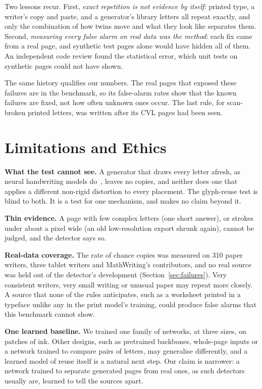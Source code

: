 \documentclass[conference]{IEEEtran}
\begin{document}
Two lessons recur. First, \emph{exact repetition is not evidence by itself}: printed type, a writer's copy and
paste, and a generator's library letters all repeat exactly, and only the combination of how twins move and what they
look like separates them. Second, \emph{measuring every false alarm on real data was the method}: each fix came from a
real page, and synthetic test pages alone would have hidden all of them. An independent code review found the
statistical error, which unit tests on synthetic pages could not have shown.

The same history qualifies our numbers. The real pages that exposed these failures are in the benchmark, so its
false-alarm rates show that the known failures are fixed, not how often unknown ones occur. The last rule, for
scan-broken printed letters, was written after its \CvlBeforeFixK{} CVL pages had been seen.

\section{Limitations and Ethics}

\textbf{What the test cannot see.} A generator that draws every letter afresh, as neural handwriting
models do~\cite{graves2013generating,fogel2020scrabblegan}, leaves no copies, and neither does one that applies a
different non-rigid distortion to every placement. The glyph-reuse test is blind to both. It is a test for one
mechanism, and makes no claim beyond it.

\textbf{Thin evidence.} A page with few complex letters (one short answer), or strokes under about a pixel wide (an old
low-resolution export shrunk again), cannot be judged, and the detector says so.

\textbf{Real-data coverage.} The rate of chance copies was measured on 310 paper writers, three tablet writers and
MathWriting's contributors, and no real source was held out of the detector's development (Section~\ref{sec:failures}).
Very consistent writers, very small writing or unusual paper may repeat more closely. A source that none of the rules
anticipates, such as a worksheet printed in a typeface unlike any in the print model's training, could produce false
alarms that this benchmark cannot show.

\textbf{One learned baseline.} We trained one family of networks, at three sizes, on patches of ink. Other designs,
such as pretrained backbones, whole-page inputs or a network trained to compare pairs of letters, may generalise
differently, and a learned model of reuse itself is a natural next step. Our claim is narrower: a network trained to
separate generated pages from real ones, as such detectors usually are, learned to tell the sources apart.
\end{document}
